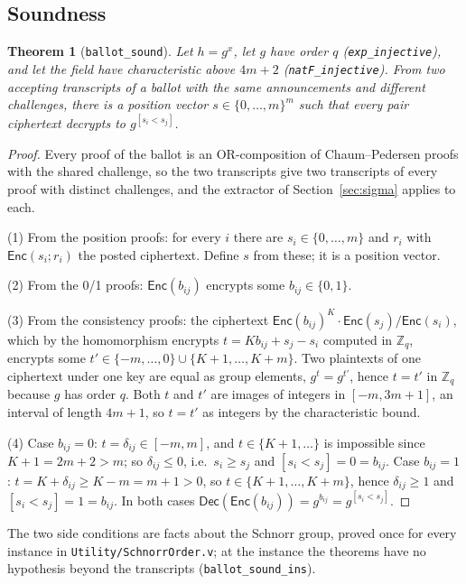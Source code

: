 \documentclass[11pt,a4paper]{article}
\newcommand{\Z}{\mathbb{Z}}
\newcommand{\Enc}{\mathsf{Enc}}
\newcommand{\Dec}{\mathsf{Dec}}
\newcommand{\rocq}[1]{\texttt{#1}}
\newtheorem{theorem}{Theorem}[section]
\theoremstyle{remark}
\begin{document}
\subsection{Soundness}
\begin{theorem}[\rocq{ballot\_sound}]\label{thm:b1sound}
Let $h = g^x$, let $g$ have order $q$ (\rocq{exp\_injective}), and let the
field have characteristic above $4m + 2$ (\rocq{natF\_injective}). From two
accepting transcripts of a ballot with the same announcements and different
challenges, there is a position vector $s \in \{0, \ldots, m\}^m$ such that
every pair ciphertext decrypts to $g^{[s_i < s_j]}$.
\end{theorem}
\begin{proof}
Every proof of the ballot is an OR-composition of Chaum--Pedersen proofs
with the shared challenge, so the two transcripts give two transcripts of
every proof with distinct challenges, and the extractor of
Section~\ref{sec:sigma} applies to each.

(1) From the position proofs: for every $i$ there are $s_i \in \{0, \ldots,
m\}$ and $r_i$ with $\Enc(s_i; r_i)$ the posted ciphertext. Define $s$ from
these; it is a position vector.

(2) From the 0/1 proofs: $\Enc(b_{ij})$ encrypts some $b_{ij} \in \{0, 1\}$.

(3) From the consistency proofs: the ciphertext $\Enc(b_{ij})^K \cdot
\Enc(s_j) / \Enc(s_i)$, which by the homomorphism encrypts $t = K b_{ij} +
s_j - s_i$ computed in $\Z_q$, encrypts some $t' \in \{-m, \ldots, 0\} \cup
\{K+1, \ldots, K+m\}$. Two plaintexts of one ciphertext under one key are
equal as group elements, $g^{t} = g^{t'}$, hence $t = t'$ in $\Z_q$ because
$g$ has order $q$. Both $t$ and $t'$ are images of integers in $[-m, 3m+1]$,
an interval of length $4m + 1$, so $t = t'$ as integers by the
characteristic bound.

(4) Case $b_{ij} = 0$: $t = \delta_{ij} \in [-m, m]$, and $t \in \{K+1,
\ldots\}$ is impossible since $K + 1 = 2m + 2 > m$; so $\delta_{ij} \le 0$,
i.e.\ $s_i \ge s_j$ and $[s_i < s_j] = 0 = b_{ij}$. Case $b_{ij} = 1$: $t =
K + \delta_{ij} \ge K - m = m + 1 > 0$, so $t \in \{K+1, \ldots, K+m\}$,
hence $\delta_{ij} \ge 1$ and $[s_i < s_j] = 1 = b_{ij}$. In both cases
$\Dec(\Enc(b_{ij})) = g^{b_{ij}} = g^{[s_i < s_j]}$.
\end{proof}
The two side conditions are facts about the Schnorr group, proved once for
every instance in \rocq{Utility/SchnorrOrder.v}; at the instance the
theorems have no hypothesis beyond the transcripts
(\rocq{ballot\_sound\_ins}).
\end{document}
